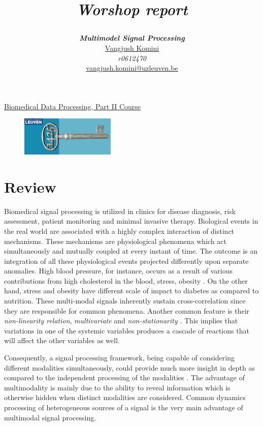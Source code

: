 \documentclass[a4paper]{article}
\title{\centerline{\textit{Worshop report}} }
\author{\textbf{\textit{Multimodel Signal Processing}}\\
\href{mailto:vangjush.komini@uzleuven.be}{Vangjush Komini}\\  \textit{r0612470} \\
\href{mailto:vangjush.komini@uzleuven.be}{vangjush.komini@uzleuven.be}\\
}
\begin{document}
\maketitle
\begin{center}
\Large \href{https://onderwijsaanbod.kuleuven.be/syllabi/e/H06W1AE.htm#activetab=doelstellingen_idp41200}{Biomedical Data Processing, Part II Course}
\end{center}

\begin{figure}[!htbp]
\centering
\includegraphics[width=0.4\textwidth]{icon1.png}
\end{figure}



\newpage

\section{Review}



Biomedical signal processing is utilized in clinics for disease diagnosis, risk assessment, patient monitoring and minimal invasive therapy. Biological events in the real world are associated with a highly complex interaction of distinct mechanisms. These mechanisms are physiological phenomena which act simultaneously and mutually coupled at every instant of time. The outcome is an integration of all these physiological events projected differently upon separate anomalies. High blood pressure, for instance, occurs as a result of various contributions from high cholesterol in the blood, stress, obesity \cite{1}. On the other hand, stress and obesity have different scale of impact to diabetes as compared to nutrition\cite{2}. These multi-modal signals inherently sustain cross-correlation since they are responsible for common phenomena. Another common feature is their \textit{non-linearity relation}, \textit{multivariate} and \textit{non-stationarity} \cite{3}. This implies that variations in one of the systemic variables produces a cascade
of reactions that will affect the other variables as well.

Consequently, a signal processing framework, being capable of considering different modalities simultaneously, could provide much more insight in depth as compared to the independent processing of the modalities \cite{3}. The advantage of multimodality is mainly due to the ability to reveal information which is otherwise hidden when distinct modalities are considered. Common dynamics processing of heterogeneous sources of a signal is the very main advantage of multimodal signal processing. 
\end{document}
